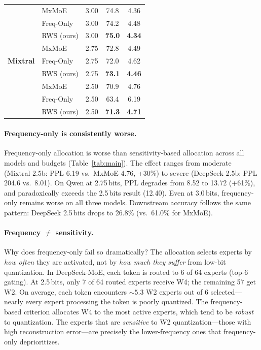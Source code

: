 \begin{table}[t]
\begin{tabular}{llccc}
\midrule
\multirow{9}{*}{\textbf{Mixtral}}
& MxMoE      & 3.00 & 74.8 &   4.36 \\
& Freq-Only  & 3.00 & 74.2 &   4.48 \\
& RWS (ours) & 3.00 & \textbf{75.0} & \textbf{4.34} \\
\cmidrule(lr){2-5}
& MxMoE      & 2.75 & 72.8 &   4.49 \\
& Freq-Only  & 2.75 & 72.0 &   4.62 \\
& RWS (ours) & 2.75 & \textbf{73.1} & \textbf{4.46} \\
\cmidrule(lr){2-5}
& MxMoE      & 2.50 & 70.9 &   4.76 \\
& Freq-Only  & 2.50 & 63.4 &   6.19 \\
& RWS (ours) & 2.50 & \textbf{71.3} & \textbf{4.71} \\
\bottomrule
\end{tabular}
\end{table}

\paragraph{Frequency-only is consistently worse.}
Frequency-only allocation is worse than sensitivity-based allocation across all models and budgets (Table~\ref{tab:main}). The effect ranges from moderate (Mixtral 2.5b: PPL 6.19 vs.\ MxMoE 4.76, +30\%) to severe (DeepSeek 2.5b: PPL 204.6 vs.\ 8.01). On Qwen at 2.75\,bits, PPL degrades from 8.52 to 13.72 (+61\%), and paradoxically exceeds the 2.5\,bits result (12.40). Even at 3.0\,bits, frequency-only remains worse on all three models. Downstream accuracy follows the same pattern: DeepSeek 2.5\,bits drops to 26.8\% (vs.\ 61.0\% for MxMoE).

\paragraph{Frequency $\neq$ sensitivity.}
Why does frequency-only fail so dramatically? The allocation selects experts by \emph{how often} they are activated, not by \emph{how much they suffer} from low-bit quantization. In DeepSeek-MoE, each token is routed to 6 of 64 experts (top-6 gating). At 2.5\,bits, only 7 of 64 routed experts receive W4; the remaining 57 get W2. On average, each token encounters ${\sim}5.3$ W2 experts out of 6 selected---nearly every expert processing the token is poorly quantized. The frequency-based criterion allocates W4 to the most active experts, which tend to be \emph{robust} to quantization. The experts that are \emph{sensitive} to W2 quantization---those with high reconstruction error---are precisely the lower-frequency ones that frequency-only deprioritizes.

